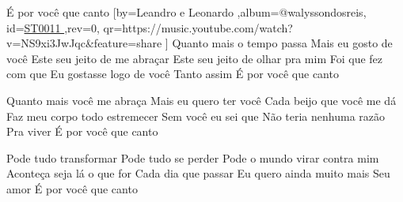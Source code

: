\beginsong
{É por você que canto %
}[by={Leandro e Leonardo %
},album={@walyssondosreis},
id={\href{https://music.youtube.com/watch?v=NS9xi3JwJqc&feature=share %
}{ST0011 %
}},rev={0}, %
qr={https://music.youtube.com/watch?v=NS9xi3JwJqc&feature=share %
}]
\beginverse 
Quanto mais o tempo passa
Mais eu gosto de você
Este seu jeito de me abraçar
Este seu jeito de olhar pra mim
Foi que fez com que
Eu gostasse logo de você
Tanto assim
É por você que canto
\endverse

\beginverse 
Quanto mais você me abraça
Mais eu quero ter você
Cada beijo que você me dá
Faz meu corpo todo estremecer
Sem você eu sei que
Não teria nenhuma razão
Pra viver
É por você que canto
\endverse

\beginverse 
Pode tudo transformar
Pode tudo se perder
Pode o mundo virar contra mim
Aconteça seja lá o que for
Cada dia que passar
Eu quero ainda muito mais
Seu amor
É por você que canto
\endverse

